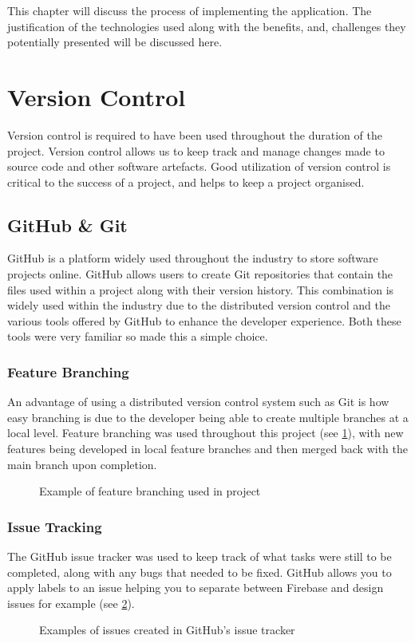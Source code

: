 This chapter will discuss the process of implementing the application. The justification of the technologies used along with the benefits, and, challenges they potentially presented will be discussed here.

\section{Version Control}
Version control is required to have been used throughout the duration of the project. Version control allows us to keep track and manage changes made to source code and other software artefacts. Good utilization of version control is critical to the success of a project, and helps to keep a project organised.
\subsection{GitHub \& Git}
GitHub \cite{github} is a platform widely used throughout the industry to store software projects online. GitHub allows users to create Git repositories \cite{git} that contain the files used within a project along with their version history. This combination is widely used within the industry due to the distributed version control and the various tools offered by GitHub to enhance the developer experience. Both these tools were very familiar so made this a simple choice. 
\subsubsection{Feature Branching}
An advantage of using a distributed version control system such as Git is how easy branching is due to the developer being able to create multiple branches at a local level. Feature branching was used throughout this project (see \ref{fig:branching}), with new features being developed in local feature branches and then merged back with the main branch upon completion.  
\begin{figure}[!htbp]
    \centering
    \begin{subfigure}[b]{0.90\textwidth}
    \end{subfigure}
    \caption{Example of feature branching used in project}
    \label{fig:branching}
\end{figure}
\subsubsection{Issue Tracking}
The GitHub issue tracker was used to keep track of what tasks were still to be completed, along with any bugs that needed to be fixed. GitHub allows you to apply labels to an issue helping you to separate between Firebase and design issues for example (see \ref{fig:issues}).
\begin{figure}[!htbp]
    \centering
    \begin{subfigure}[b]{0.90\textwidth}
    \end{subfigure}
    \caption{Examples of issues created in GitHub's issue tracker}
    \label{fig:issues}
\end{figure}

